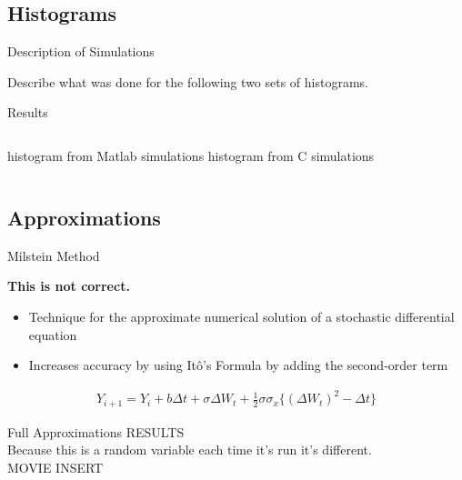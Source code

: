 
\subsection{Histograms}

\begin{frame}{Description of Simulations}

  Describe what was done for the following two sets of histograms.

\end{frame}


\begin{frame}{Results}
 

  \begin{columns}[t]
    histogram from Matlab simulations
    histogram from C simulations
  \end{columns}


\end{frame}



\subsection{Approximations}

\begin{frame}{Milstein Method}

    \textbf{This is not correct.}

	\begin{itemize}
		\item Technique for the approximate numerical solution of a stochastic differential equation
		\item Increases accuracy by using It\^o's Formula by adding the second-order term
	\end{itemize} 

	\begin{align*}
		Y_{i+1} = Y_i +b\Delta t + \sigma \Delta W_t + \frac{1}{2} \sigma \sigma_x \{(\Delta W_t)^2 - \Delta t\} 
	\end{align*}

\end{frame}

\begin{frame}{Full Approximations}
RESULTS \\
Because this is a random variable each time it's run it's different. \\
MOVIE INSERT 
\end{frame}

